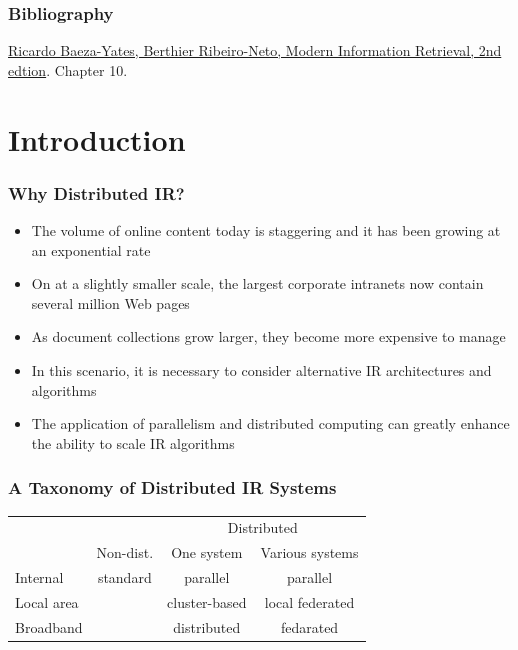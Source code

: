 \documentclass{beamer}
\subtitle{Distributed Information Retrieval}
\begin{document}
\maketitle


\makeoutline

\begin{frame}
    \frametitle{Bibliography}
    \begin{block}{}
        \href{http://www.mir2ed.org/}{Ricardo Baeza-Yates,
            Berthier Ribeiro-Neto, Modern Information Retrieval, 2nd
            edtion}. Chapter 10.
    \end{block}
\end{frame}

\section{Introduction}

\begin{frame}
    \frametitle{Why Distributed IR?}
    
    \begin{itemize}
    \item The volume of online content today is staggering and it has been
        growing at an exponential rate
    \item On at a slightly smaller scale, the largest corporate intranets now
        contain several million Web pages
    \item As document collections grow larger, they become more expensive to
        manage
    \item In this scenario, it is necessary to consider alternative IR
        architectures and algorithms
    \item The application of parallelism and distributed computing can greatly
        enhance the ability to scale IR algorithms
    \end{itemize}
\end{frame}

\begin{frame}
    \frametitle{A Taxonomy of Distributed IR Systems}
    
    \begin{center}
        \begin{tabular}{|l|c|c|c|}\hline
          & & \multicolumn{2}{|c|}{Distributed} \\\cline{3-4}
          & Non-dist. & One system & Various systems \\\hline\hline
          Internal & standard & parallel & parallel \\\hline
          Local area & & cluster-based & local federated \\\hline
          Broadband & & distributed & fedarated \\\hline
        \end{tabular}
    \end{center}
\end{frame}
\end{document}
